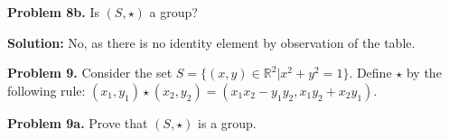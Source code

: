 \documentclass[12pt, letterpaper]{article}
\newenvironment{problem}
    [1]
    {\noindent \textbf{Problem #1.}}
    {\vspace{3mm}}
\newenvironment{solution}
    [0]
    {\noindent \textbf{Solution:}} 
    {\vspace{3mm}}
\begin{document}
    \begin{problem}{8b}
        Is $(S, \star)$ a group?
    \end{problem}

    \begin{solution}
        No, as there is no identity element by observation of the table.
    \end{solution}

    \begin{problem}{9}
        Consider the set $S = \{(x, y) \in \mathbb{R}^2 | x^2 + y^2 = 1\}$. Define
        $\star$ by the following rule: $(x_1, y_1) \star (x_2, y_2) = 
        (x_1 x_2 - y_1 y_2, x_1 y_2 + x_2 y_1)$.
    \end{problem}

    \begin{problem}{9a}
        Prove that $(S, \star)$ is a group.
    \end{problem}
\end{document}
